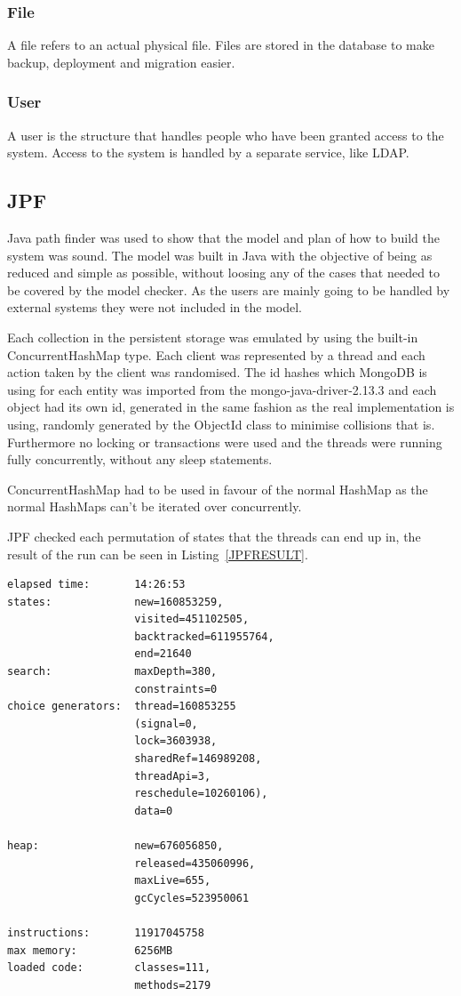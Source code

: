 \documentclass[a4paper,12pt]{article}
\begin{document}
\subsubsection{File}
A file refers to an actual physical file. Files are stored in the database to make backup, deployment and migration easier.

\subsubsection{User}
A user is the structure that handles people who have been granted access to the system.
Access to the system is handled by a separate service, like LDAP.

\subsection{JPF}
Java path finder was used to show that the model and plan of how to build the system was sound. The model was built in Java 
with the objective of being as reduced and simple as possible, without loosing any of the cases that needed to be covered 
by the model checker. As the users are mainly going to be handled by external systems they were not included in the model.

Each collection in the persistent storage was emulated by using the built-in ConcurrentHashMap type. 
Each client was represented by a thread and each action taken by the client was randomised. The id hashes which MongoDB is 
using for each entity was imported from the mongo-java-driver-2.13.3 and each object had its own id, generated in the same 
fashion as the real implementation is using, randomly generated by the ObjectId class to minimise collisions that is. 
Furthermore no locking or transactions were used and the threads were running fully concurrently, without any sleep statements. 

ConcurrentHashMap had to be used in favour of the normal HashMap as the normal HashMaps can't be iterated over concurrently.

JPF checked each permutation of states that the threads can end up in, the result of the run can be seen in Listing~\ref{JPFRESULT}.

\newpage
\begin{lstlisting}[label=JPFRESULT,caption=Results of JPF run]
elapsed time:       14:26:53
states:             new=160853259,
                    visited=451102505,
                    backtracked=611955764,
                    end=21640
search:             maxDepth=380,
                    constraints=0
choice generators:  thread=160853255 
                    (signal=0,
                    lock=3603938,
                    sharedRef=146989208,
                    threadApi=3,
                    reschedule=10260106), 
                    data=0

heap:               new=676056850,
                    released=435060996,
                    maxLive=655,
                    gcCycles=523950061

instructions:       11917045758
max memory:         6256MB
loaded code:        classes=111,
                    methods=2179
\end{lstlisting}
\end{document}
